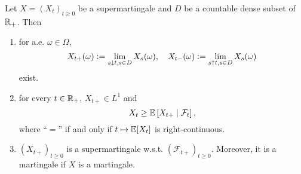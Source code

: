 \begin{thm}
    Let $X = (X_t)_{t \geq 0}$ be a supermartingale and $D$ be a countable dense subset of $\mathbb{R}_+$. Then
    \begin{enumerate}[label=(\arabic{*})]
        \item for a.e. $\omega \in \Omega$,
        \begin{equation*}
            X_{t+}(\omega) \vcentcolon= \lim_{s \downarrow t,s\in D} X_s(\omega),\quad X_{t-}(\omega) \vcentcolon= \lim_{s \uparrow t,s\in D} X_s(\omega)
        \end{equation*}
        exist.
        \item for every $t \in \mathbb{R}_+$, $X_{t+} \in L^1$ and 
        \begin{equation*}
            X_t \geq \mathbb{E}\left[X_{t+} \mid \mathcal{F}_t\right],
        \end{equation*}
        where ``$=$'' if and only if $t \mapsto \mathbb{E}[X_t]$ is right-continuous.
        \item $(X_{t+})_{t \geq 0}$ is a supermartingale w.s.t. $(\mathcal{F}_{t+})_{t \geq 0}$. Moreover, it is a martingale if $X$ is a martingale.
    \end{enumerate}
\end{thm}
